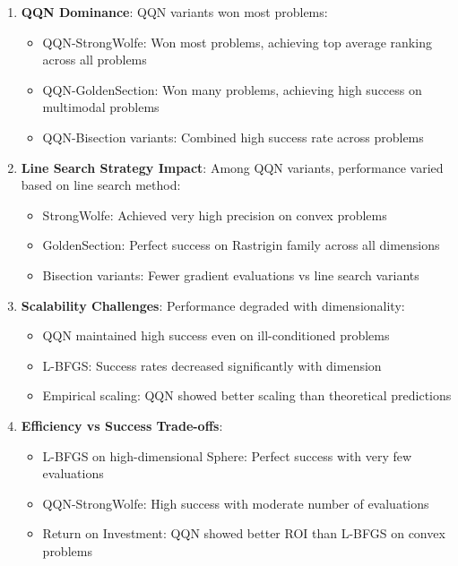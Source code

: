 \begin{enumerate}
\def\labelenumi{\arabic{enumi}.}
\tightlist
\item
  \textbf{QQN Dominance}: QQN variants won most problems:

  \begin{itemize}
  \tightlist
  \item
    QQN-StrongWolfe: Won most problems, achieving top average ranking across all problems
  \item
    QQN-GoldenSection: Won many problems, achieving high success on multimodal problems
  \item
    QQN-Bisection variants: Combined high success rate across problems
  \end{itemize}
\item
  \textbf{Line Search Strategy Impact}: Among QQN variants, performance varied based on line search method:

  \begin{itemize}
  \tightlist
  \item
    StrongWolfe: Achieved very high precision on convex problems
  \item
    GoldenSection: Perfect success on Rastrigin family across all dimensions
  \item
    Bisection variants: Fewer gradient evaluations vs line search variants
  \end{itemize}
\item
  \textbf{Scalability Challenges}: Performance degraded with dimensionality:

  \begin{itemize}
  \tightlist
  \item
    QQN maintained high success even on ill-conditioned problems
  \item
    L-BFGS: Success rates decreased significantly with dimension
  \item
    Empirical scaling: QQN showed better scaling than theoretical predictions
  \end{itemize}
\item
  \textbf{Efficiency vs Success Trade-offs}:

  \begin{itemize}
  \tightlist
  \item
    L-BFGS on high-dimensional Sphere: Perfect success with very few evaluations
  \item
    QQN-StrongWolfe: High success with moderate number of evaluations
  \item
    Return on Investment: QQN showed better ROI than L-BFGS on convex problems
  \end{itemize}
\end{enumerate}

